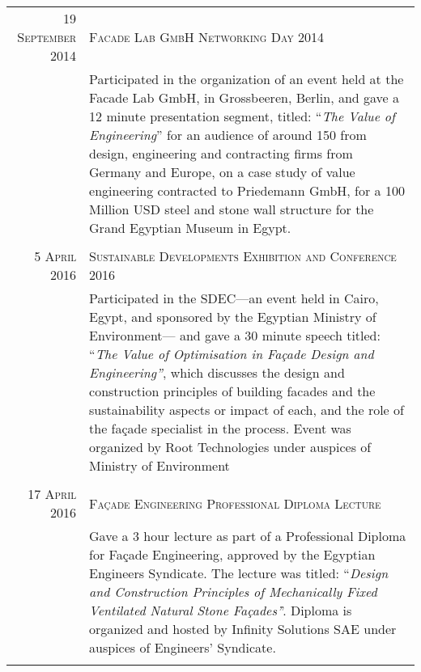 \documentclass[a4paper,11pt]{article} %
\begin{document}
\begin{tabular}{r|p{11cm}}
\textsc{19 September 2014} & \textsc{Facade Lab GmbH Networking Day 2014}\\ 
& \footnotesize{Participated in the organization of an event held at the Facade Lab GmbH, in Grossbeeren, Berlin, and gave a 12 minute presentation segment, titled: ``\emph{The Value of Engineering}'' for an audience of around 150 from design, engineering and contracting firms from Germany and Europe, on a case study of value engineering contracted to Priedemann GmbH, for a 100 Million USD steel and stone wall structure for the Grand Egyptian Museum in Egypt.}\\
\multicolumn{2}{c}{} \\

\textsc{5 April 2016} & \textsc{Sustainable Developments Exhibition and Conference 2016}\\ 
& \footnotesize{Participated in the SDEC---an event held in Cairo, Egypt, and sponsored by the Egyptian Ministry of Environment--- and gave a 30 minute speech titled: ``\emph{The Value of Optimisation in Fa\c{c}ade Design and Engineering''}, which discusses the design and construction principles of building facades and the sustainability aspects or impact of each, and the role of the fa\c{c}ade specialist in the process. Event was organized by Root Technologies under auspices of Ministry of Environment}\\
\multicolumn{2}{c}{} \\

\textsc{17 April 2016} & \textsc{Fa\c{c}ade Engineering Professional Diploma Lecture}\\ 
& \footnotesize{Gave a 3 hour lecture as part of a Professional Diploma for Fa\c{c}ade Engineering, approved by the Egyptian Engineers Syndicate. The lecture was titled: ``\emph{Design and Construction Principles of Mechanically Fixed Ventilated Natural Stone Fa\c{c}ades'}'. Diploma is organized and hosted by Infinity Solutions SAE under auspices of Engineers' Syndicate.}\\
\multicolumn{2}{c}{} \\

\end{tabular}

\end{document}
